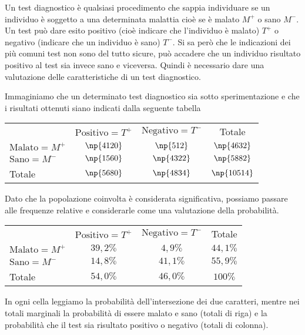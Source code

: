 \begin{exrig}
\begin{esempio}
Un test diagnostico è qualsiasi procedimento che sappia individuare
se un individuo è soggetto a una determinata malattia cioè se è malato $ M^+ $ o
sano $ M^- $. Un test può dare esito positivo (cioè indicare che
l'individuo è malato) $ T^+ $ o negativo (indicare che un
individuo è sano) $ T^- $. Si sa però che le indicazioni dei più comuni
test non sono del tutto sicure, può accadere che un individuo risultato
positivo al test sia invece sano e viceversa. Quindi è necessario dare
una valutazione delle caratteristiche di un test diagnostico.

Immaginiamo che un determinato test diagnostico sia sotto
sperimentazione e che i risultati ottenuti siano indicati dalla
seguente tabella
\begin{center}
\begin{tabular}{lccc}
& $\text{Positivo}=T^+$ & $\text{Negativo}=T^-$ & Totale\\
$\text{Malato}=M^+$& $ \np{4120} $ & $ \np{512} $ & $ \np{4632} $ \\
$\text{Sano}=M^-$& $ \np{1560} $ & $ \np{4322} $ & $ \np{5882} $ \\
Totale & $ \np{5680} $ & $ \np{4834} $ & $ \np{10514} $\\
\end{tabular}
\end{center}
Dato che la popolazione coinvolta è considerata significativa, possiamo
passare alle frequenze  relative e considerarle come una valutazione
della probabilità.
\begin{center}
\begin{tabular}{lccc}
& $\text{Positivo}=T^+$ & $\text{Negativo}=T^-$ & Totale\\
$\text{Malato}=M^+$& $ 39,2\% $ & $ 4,9\% $ & $ 44,1\% $ \\
$\text{Sano}=M^-$& $ 14,8\% $ & $ 41,1\% $ & $ 55,9\% $ \\
Totale & $ 54,0\% $ & $ 46,0\% $ & $ 100\% $\\
\end{tabular}
\end{center}
In ogni cella leggiamo la probabilità dell'intersezione
dei due caratteri, mentre nei totali marginali la probabilità di essere
malato e sano (totali di riga) e la probabilità che il test sia
risultato positivo o negativo (totali di colonna).


\end{esempio}
\end{exrig}
